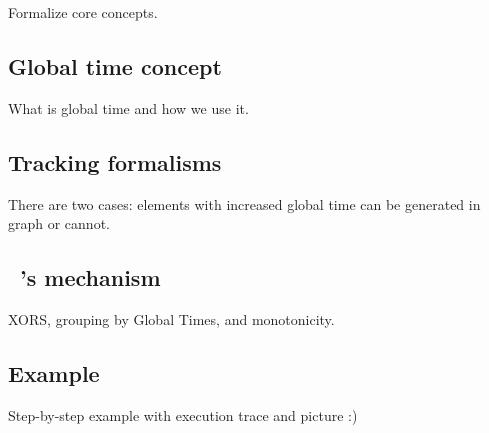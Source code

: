 \label {fs-acker-design}

Formalize core concepts.

\subsection{Global time concept}
What is global time and how we use it.

\subsection{Tracking formalisms}
There are two cases: elements with increased global time can be generated in graph or cannot.

\subsection{\tracker\ 's mechanism}
XORS, grouping by Global Times, and monotonicity. 

\subsection{Example}
Step-by-step example with execution trace and picture :)


